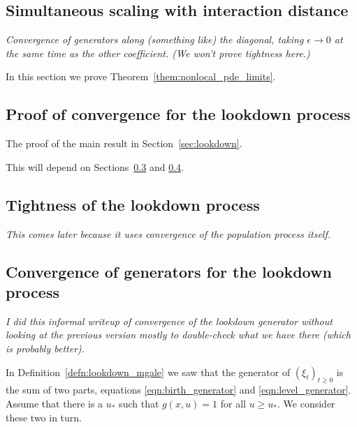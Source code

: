 \documentclass[12pt]{article}
\newcommand{\lp}{\xi}              %
\newcommand{\comment}[1]{{\color{blue} \it #1}}
\begin{document}
\subsection{Simultaneous scaling with interaction distance}

\comment{
    Convergence of generators along (something like) the diagonal,
    taking $\epsilon \to 0$ at the same time as the other coefficient.
    (We won't prove tightness here.)
}

In this section we prove Theorem~\ref{them:nonlocal_pde_limits}.



\subsection{Proof of convergence for the lookdown process}

The proof of the main result in Section~\ref{sec:lookdown}.

This will depend on Sections~\ref{sec:lookdown_tightness_proofs}
and \ref{sec:lookdown_generator_proofs}.


\subsection{Tightness of the lookdown process}
    \label{sec:lookdown_tightness_proofs}

\comment{
    This comes later because it uses convergence of the population process itself.
}


\subsection{Convergence of generators for the lookdown process}
    \label{sec:lookdown_generator_proofs}


\comment{
    I did this informal writeup of convergence of the lookdown generator
    without looking at the previous version
    mostly to double-check what we have there
    (which is probably better).
}

In Definition~\ref{defn:lookdown_mgale} we saw that the generator
of $(\lp_t)_{t \ge 0}$ is the sum of two parts,
equations \eqref{eqn:birth_generator} and \eqref{eqn:level_generator}.
Assume that there is a $u_*$ such that $g(x, u) = 1$ for all $u \ge u_*$.
We consider these two in turn.
\end{document}

